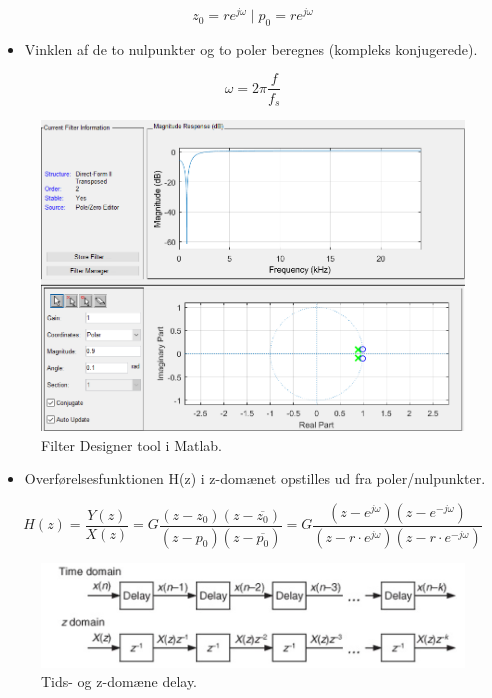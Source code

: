 \documentclass[danish]{article}
\begin{document}
\begin{equation}
z_0 = r e^{j\omega} \mid p_0 = r e^{j\omega}
\end{equation}

\begin{itemize}
	\item Vinklen af de to nulpunkter og to poler beregnes (kompleks konjugerede).
\end{itemize}

\begin{equation}
\omega = 2\pi \frac{f}{f_s}
\end{equation}

\begin{figure}[H]
	\centering
	\includegraphics[width=0.6\linewidth]{graphics/notchfilter}
	\caption{Filter Designer tool i Matlab.}
	\label{fig:notchfilter}
\end{figure}

\begin{itemize}
	\item Overførelsesfunktionen H(z) i z-domænet opstilles ud fra poler/nulpunkter.
\end{itemize}

\begin{equation}
H(z) = \frac{Y(z)}{X(z)} = G \frac{(z - z_0)(z-\overline{z_0})}{(z - p_0)(z-\overline{p_0})} = G \frac{(z - e^{j\omega})(z - e^{-j\omega})}{(z - r\cdot  e^{j\omega})(z-r\cdot e^{-j\omega})}
\end{equation}

\begin{figure}[H]
	\centering
	\includegraphics[width=0.6\linewidth]{graphics/z_domain_delay}
	\caption{Tids- og z-domæne delay.}
	\label{fig:z_domain_delay}
\end{figure}
\end{document}
